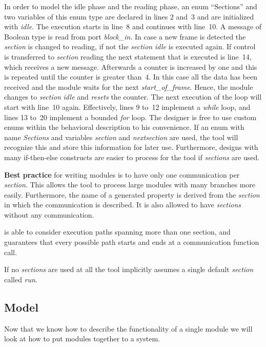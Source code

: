 In order to model the idle phase and the reading phase, an enum
``Sections'' and two variables of this enum type are declared in lines
2 and~3 and are initialized with \textit{idle}. %
The execution starts in line~8 and continues with line~10. %
A message of Boolean type is read from port \textit{block\_in}. %
In case a new frame is detected the \textit{section} is changed to
reading, if not the \textit{section} \textit{idle} is executed
again. %
If control is transferred to \textit{section} reading the next statement that is
executed is line~14, which receives a new message. %
Afterwards a counter is increased by one and this is repeated until
the counter is greater than~4. %
In this case all the data has been received and the module waits for the next
\textit{start\_of\_frame}. %
Hence, the module changes to \textit{section} \textit{idle} and
\textit{resets} the counter. %
The next execution of the loop will start with line~10 again. %
  Effectively, lines 9 to~12 implement a \textit{while} loop, and lines 13
  to~20 implement a bounded \textit{for} loop. %
The designer is free to use custom enums within the behavioral
description to his convenience. %
If an enum with name \textit{Sections} and variables \textit{section}
and \textit{nextsection} are used, the tool will recognize this and
store this information for later use. %
Furthermore, designs with many if-then-else constructs
are easier to process for the tool if \textit{sections} are used. %

\newpage
\textbf{Best practice} for writing modules is to have only one
communication per \textit{section}. %
This allows the tool to process large modules with many branches more
easily. %
Furthermore, the name of a generated property is derived from the
\textit{section} in which the communication is described. %
It is also allowed to have \textit{sections} without any
communication. %
%

\DeSCAM{} is able to consider execution paths spanning more than one
section, and guarantees that every possible path starts and ends at a
communication function call. %

If no \textit{sections} are used at all the tool implicitly assumes a
single default \textit{section} called \textit{run}. %
 
\subsection{Model}
\label{section:model}

  Now that we know how to describe the functionality of a single
  module we will look at how to put modules together to a system. %

